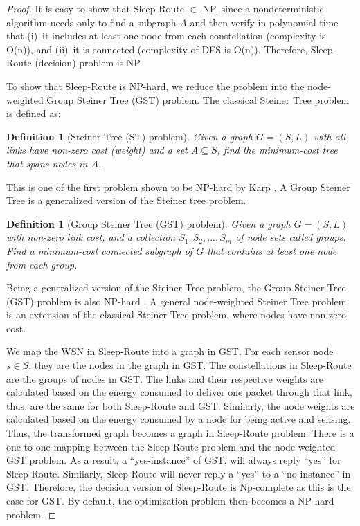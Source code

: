 \documentclass[conference]{IEEEtran}
\newtheorem{definition}[theo]{Definition}
\begin{document}
\begin{proof}
It is easy to show that Sleep-Route $\in$ NP, since a nondeterministic algorithm needs only to find a subgraph $A$ and then verify in polynomial time that (i)~it includes at least one node from each constellation (complexity is O(n)), and (ii)~it is connected (complexity of DFS is O(n)). Therefore, Sleep-Route (decision) problem is NP.

To show that Sleep-Route is NP-hard, we reduce the problem into the node-weighted Group Steiner Tree (GST) problem. The classical Steiner Tree problem is defined as:

\begin{definition}[Steiner Tree (ST) problem] Given a graph $G=(S,L)$ with all links have non-zero cost (weight) and a set $A\subseteq S$, find the minimum-cost tree that spans nodes in $A$.
\end{definition}

This is one of the first problem shown to be NP-hard by Karp \cite{karp1972reducibility}. A Group Steiner Tree is a generalized version of the Steiner tree problem.

\begin{definition}[Group Steiner Tree (GST) problem] Given a graph $G=(S,L)$ with non-zero link cost, and a collection $S_{1}, S_{2}, ..., S_{m}$ of node sets called groups. Find a minimum-cost connected subgraph of $G$ that contains at least one node from each group.
\end{definition}
Being a generalized version of the Steiner Tree problem, the Group Steiner Tree (GST) problem is also NP-hard \cite{ihler1999class}. A general node-weighted Steiner Tree problem is an extension of the classical Steiner Tree problem, where nodes have non-zero cost. 

We map the WSN in Sleep-Route into a graph in GST. For each sensor node $s \in S$, they are the nodes in the graph in GST. The constellations in Sleep-Route are the groups of nodes in GST. The links and their respective weights are calculated based on the energy consumed to deliver one packet through that link, thus, are the same for both Sleep-Route and GST. Similarly, the node weights are calculated based on the energy consumed by a node for being active and sensing. Thus, the transformed graph becomes a graph in Sleep-Route problem. There is a one-to-one mapping between the Sleep-Route problem and the node-weighted GST problem. As a result, a ``yes-instance'' of GST, will always reply ``yes'' for Sleep-Route. Similarly, Sleep-Route will never reply a ``yes'' to a ``no-instance'' in GST. Therefore, the decision version of Sleep-Route is Np-complete as this is the case for GST. By default, the optimization problem then becomes a NP-hard problem.
\end{proof}
\end{document}
